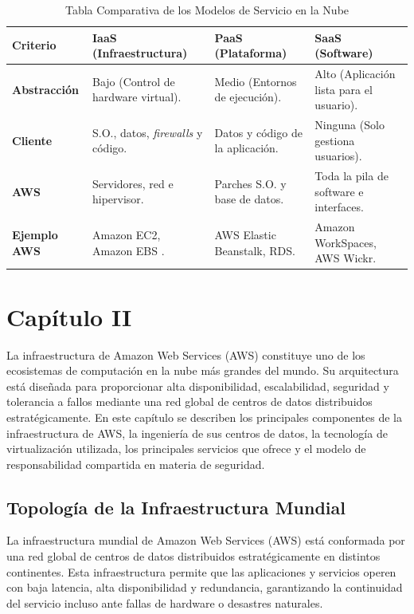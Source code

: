 \documentclass[12pt,a4paper]{article}
\begin{document}
\vspace{0.3cm}
\begin{table}[H]
\centering
\caption{Tabla Comparativa de los Modelos de Servicio en la Nube}
\label{tab:modelos_servicio}
\begin{tabular}{ p{3.2cm} p{3.4cm} p{3.4cm} p{3.4cm} }
\toprule
\textbf{Criterio} & \textbf{IaaS (Infraestructura)} & \textbf{PaaS (Plataforma)} & \textbf{SaaS (Software)} \\
\midrule
\textbf{Abstracción} & Bajo (Control de hardware virtual). & Medio (Entornos de ejecución). & Alto (Aplicación lista para el usuario). \\
\textbf{Cliente} & S.O., datos, \textit{firewalls} y código. & Datos y código de la aplicación. & Ninguna (Solo gestiona usuarios). \\
\textbf{AWS} & Servidores, red e hipervisor. & Parches S.O. y base de datos. & Toda la pila de software e interfaces. \\
\textbf{Ejemplo AWS} & Amazon EC2, Amazon EBS \parencite{varia2014}. & AWS Elastic Beanstalk, RDS. & Amazon WorkSpaces, AWS Wickr. \\
\bottomrule
\end{tabular}
\end{table}
\vspace{0.3cm}

\section{Capítulo II}
La infraestructura de Amazon Web Services (AWS) constituye uno de los ecosistemas de computación en la nube más grandes del mundo. Su arquitectura está diseñada para proporcionar alta disponibilidad, escalabilidad, seguridad y tolerancia a fallos mediante una red global de centros de datos distribuidos estratégicamente. En este capítulo se describen los principales componentes de la infraestructura de AWS, la ingeniería de sus centros de datos, la tecnología de virtualización utilizada, los principales servicios que ofrece y el modelo de responsabilidad compartida en materia de seguridad.

\subsection{Topología de la Infraestructura Mundial}

La infraestructura mundial de Amazon Web Services (AWS) está conformada por una red global de centros de datos distribuidos estratégicamente en distintos continentes. Esta infraestructura permite que las aplicaciones y servicios operen con baja latencia, alta disponibilidad y redundancia, garantizando la continuidad del servicio incluso ante fallas de hardware o desastres naturales\parencite{awsInfrastructure}.
\end{document}
